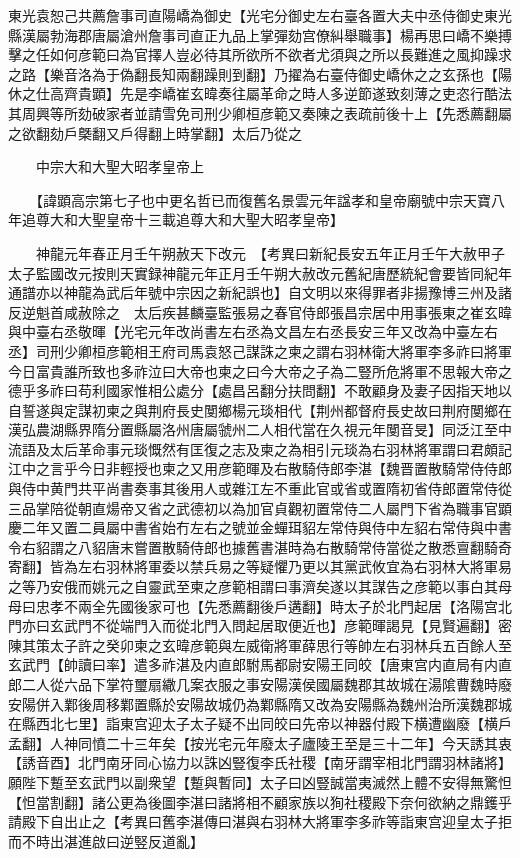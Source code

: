 東光袁恕己共薦詹事司直陽嶠為御史【光宅分御史左右臺各置大夫中丞侍御史東光縣漢屬勃海郡唐屬滄州詹事司直正九品上掌彈劾宫僚糾舉職事】楊再思曰嶠不樂搏擊之任如何彦範曰為官擇人豈必待其所欲所不欲者尤須與之所以長難進之風抑躁求之路【樂音洛為于偽翻長知兩翻躁則到翻】乃擢為右臺侍御史嶠休之之玄孫也【陽休之仕高齊貴顕】先是李嶠崔玄暐奏往屬革命之時人多逆節遂致刻薄之吏恣行酷法其周興等所劾破家者並請雪免司刑少卿桓彦範又奏陳之表疏前後十上【先悉薦翻屬之欲翻劾戶槩翻又戶得翻上時掌翻】太后乃從之

　　中宗大和大聖大昭孝皇帝上

　　【諱顕高宗第七子也中更名哲已而復舊名景雲元年諡孝和皇帝廟號中宗天寶八年追尊大和大聖皇帝十三載追尊大和大聖大昭孝皇帝】

　　神龍元年春正月壬午朔赦天下改元　【考異曰新紀長安五年正月壬午大赦甲子太子監國改元按則天實録神龍元年正月壬午朔大赦改元舊紀唐歷統紀會要皆同紀年通譜亦以神龍為武后年號中宗因之新紀誤也】自文明以來得罪者非揚豫博三州及諸反逆魁首咸赦除之　太后疾甚麟臺監張易之春官侍郎張昌宗居中用事張東之崔玄暐與中臺右丞敬暉【光宅元年改尚書左右丞為文昌左右丞長安三年又改為中臺左右丞】司刑少卿桓彦範相王府司馬袁怒己謀誅之柬之謂右羽林衛大將軍李多祚曰將軍今日富貴誰所致也多祚泣曰大帝也柬之曰今大帝之子為二豎所危將軍不思報大帝之德乎多祚曰苟利國家惟相公處分【處昌呂翻分扶問翻】不敢顧身及妻子因指天地以自誓遂與定謀初柬之與荆府長史閺鄉楊元琰相代【荆州都督府長史故曰荆府閺鄉在漢弘農湖縣界隋分置縣屬洛州唐屬虢州二人相代當在久視元年閺音旻】同泛江至中流語及太后革命事元琰慨然有匡復之志及柬之為相引元琰為右羽林將軍謂曰君頗記江中之言乎今日非輕授也柬之又用彦範暉及右散騎侍郎李湛【魏晋置散騎常侍侍郎與侍中黄門共平尚書奏事其後用人或雜江左不重此官或省或置隋初省侍郎置常侍從三品掌陪從朝直煬帝又省之武德初以為加官貞觀初置常侍二人屬門下省為職事官顕慶二年又置二員屬中書省始冇左右之號並金蟬珥貂左常侍與侍中左貂右常侍與中書令右貂謂之八貂唐末嘗置散騎侍郎也據舊書湛時為右散騎常侍當從之散悉亶翻騎奇寄翻】皆為左右羽林將軍委以禁兵易之等疑懼乃更以其黨武攸宜為右羽林大將軍易之等乃安俄而姚元之自靈武至柬之彦範相謂曰事濟矣遂以其謀告之彦範以事白其母母曰忠孝不兩全先國後家可也【先悉薦翻後戶遘翻】時太子於北門起居【洛陽宫北門亦曰玄武門不從端門入而從北門入問起居取便近也】彦範暉謁見【見賢遍翻】密陳其策太子許之癸卯柬之玄暐彦範與左威衛將軍薛思行等帥左右羽林兵五百餘人至玄武門【帥讀曰率】遣多祚湛及内直郎駙馬都尉安陽王同皎【唐東宫内直局有内直郎二人從六品下掌符璽扇繖几案衣服之事安陽漢侯國屬魏郡其故城在湯隂曹魏時廢安陽併入鄴後周移鄴置縣於安陽故城仍為鄴縣隋又改為安陽縣為魏州治所漢魏郡城在縣西北七里】詣東宫迎太子太子疑不出同皎曰先帝以神器付殿下横遭幽廢【横戶孟翻】人神同憤二十三年矣【按光宅元年廢太子廬陵王至是三十二年】今天誘其衷【誘音酉】北門南牙同心協力以誅凶豎復李氏社稷【南牙謂宰相北門謂羽林諸將】願陛下蹔至玄武門以副衆望【蹔與暫同】太子曰凶豎誠當夷滅然上體不安得無驚怛【怛當割翻】諸公更為後圖李湛曰諸將相不顧家族以狥社稷殿下奈何欲納之鼎鑊乎請殿下自出止之【考異曰舊李湛傳曰湛與右羽林大將軍李多祚等詣東宫迎皇太子拒而不時出湛進啟曰逆竪反道亂】

